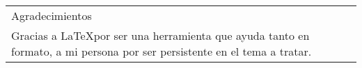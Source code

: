
\newpage

%
%

\begin{flushright}
    \begin{itshape}
        \vspace*{\fill}
        
        \begin{tabular}{| J{4cm}}
            \hspace{\fill} Agradecimientos\\
            \newline
            Gracias a \LaTeX por ser una herramienta que ayuda tanto en formato, a mi persona  por ser persistente en el tema a tratar. %
        \end{tabular}
        
        \vspace{\fill}
    \end{itshape}
\end{flushright}